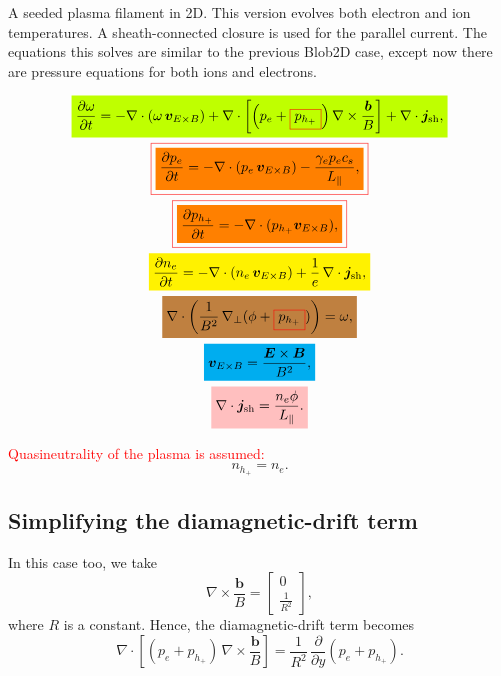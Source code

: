 \documentclass[12pt]{article}
\makeatletter
\newcommand{\mathcolorbox}[2]{\colorbox{#1}{$\displaystyle #2$}}
\newcommand*{\colorboxed}{}
\def\colorboxed#1#{\colorboxedAux{#1}}
\newcommand*{\colorboxedAux}[3]{
    \begingroup
        \colorlet{cb@saved}{.}
        \color#1{#2}
        \boxed{\color{cb@saved}#3}
    \endgroup
}
\makeatother
\begin{document}
A seeded plasma filament in 2D. This version evolves both electron and ion temperatures. A sheath-connected closure is used for the parallel current. The equations this solves are similar to the previous Blob2D case, except now there are pressure equations for both ions and electrons.

\begin{gather}
    \mathcolorbox{lime}{ \frac{\partial\omega}{\partial t} = - \nabla \cdot (\omega \, \bm{v}_{E \times B}) + \nabla \cdot \left[ \left( p_e + \colorboxed{red}{p_{h_+}} \right) \nabla \times \frac{\bm{b}}{B} \right] + \nabla \cdot \bm{j}_\text{sh} , } \\
    \colorboxed{red}{ \mathcolorbox{orange}{ \frac{\partial p_e}{\partial t} = - \nabla \cdot (p_e \, \bm{v}_{E \times B}) - \frac{\gamma_e p_e c_s}{L_\parallel} , } } \\
    \colorboxed{red}{ \mathcolorbox{orange}{ \frac{\partial p_{h_+}}{\partial t} = - \nabla \cdot (p_{h_+} \bm{v}_{E \times B}) , } } \\
    \mathcolorbox{yellow}{ \frac{\partial n_e}{\partial t} = - \nabla \cdot (n_e \, \bm{v}_{E \times B}) + \frac{1}{e} \, \nabla \cdot \bm{j}_\text{sh} , } \\
    \mathcolorbox{brown}{ \nabla \cdot \left( \frac{1}{B^2} \, \nabla_\perp (\phi + \colorboxed{red}{p_{h_+}}) \right) = \omega , } \\
    \mathcolorbox{cyan}{ \bm{v}_{E \times B} = \frac{\bm{E} \times\bm{B}}{B^2} , } \\
    \mathcolorbox{pink}{ \nabla \cdot \bm{j}_\text{sh} = \frac{n_e \phi}{L_\parallel} . }
\end{gather}

\textcolor{red}{Quasineutrality of the plasma is assumed:}
%
\begin{equation}
    n_{h_+} = n_e .
\end{equation}

\subsection{Simplifying the diamagnetic-drift term}

In this case too, we take
%
\begin{equation}
    \nabla \times \frac{\bm{b}}{B} =
    \begin{bmatrix}
        0 \\
        \frac{1}{R^2}
    \end{bmatrix}
    ,
\end{equation}
%
where $R$ is a constant. Hence, the diamagnetic-drift term becomes
%
\begin{equation}
    \nabla \cdot \left[ ( p_e + p_{h_+} ) \, \nabla \times \frac{\bm{b}}{B} \right] =
    \frac{1}{R^2} \, \frac{\partial}{\partial y} ( p_e + p_{h_+} ) .
\end{equation}
\end{document}
